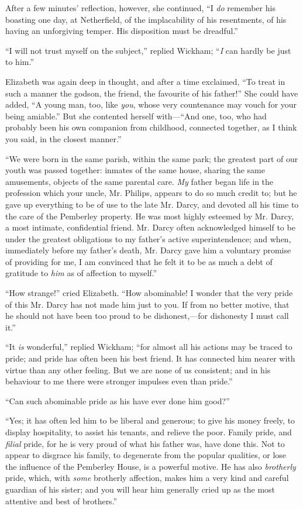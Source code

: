 \documentclass[12pt,openright]{book}
\begin{document}
After a few minutes’ reflection, however, she continued, “I \textit{do} remember his boasting one day, at Netherfield, of the implacability of his resentments, of his having an unforgiving temper. His disposition must be dreadful.”

“I will not trust myself on the subject,” replied Wickham; “\textit{I} can hardly be just to him.”

Elizabeth was again deep in thought, and after a time exclaimed, “To treat in such a manner the godson, the friend, the favourite of his father!” She could have added, “A young man, too, like \textit{you}, whose very countenance may vouch for your being amiable.” But she contented herself with—“And one, too, who had probably been his own companion from childhood, connected together, as I think you said, in the closest manner.”

“We were born in the same parish, within the same park; the greatest part of our youth was passed together: inmates of the same house, sharing the same amusements, objects of the same parental care. \textit{My} father began life in the profession which your uncle, Mr. Philips, appears to do so much credit to; but he gave up everything to be of use to the late Mr. Darcy, and devoted all his time to the care of the Pemberley property. He was most highly esteemed by Mr. Darcy, a most intimate, confidential friend. Mr. Darcy often acknowledged himself to be under the greatest obligations to my father’s active superintendence; and when, immediately before my father’s death, Mr. Darcy gave him a voluntary promise of providing for me, I am convinced that he felt it to be as much a debt of gratitude to \textit{him} as of affection to myself.”

“How strange!” cried Elizabeth. “How abominable! I wonder that the very pride of this Mr. Darcy has not made him just to you. If from no better motive, that he should not have been too proud to be dishonest,—for dishonesty I must call it.”

“It \textit{is} wonderful,” replied Wickham; “for almost all his actions may be traced to pride; and pride has often been his best friend. It has connected him nearer with virtue than any other feeling. But we are none of us consistent; and in his behaviour to me there were stronger impulses even than pride.”

“Can such abominable pride as his have ever done him good?”

“Yes; it has often led him to be liberal and generous; to give his money freely, to display hospitality, to assist his tenants, and relieve the poor. Family pride, and \textit{filial} pride, for he is very proud of what his father was, have done this. Not to appear to disgrace his family, to degenerate from the popular qualities, or lose the influence of the Pemberley House, is a powerful motive. He has also \textit{brotherly} pride, which, with \textit{some} brotherly affection, makes him a very kind and careful guardian of his sister; and you will hear him generally cried up as the most attentive and best of brothers.”
\end{document}
